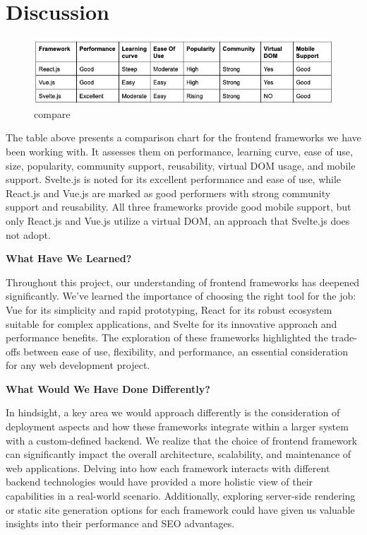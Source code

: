 \section{Discussion}

\begin{figure}[!htbp]
\centering
\includegraphics[width=\linewidth]{figs/compare.png}
\caption{compare}
\label{fig:compare}
\end{figure}

The table above presents a comparison chart for the frontend frameworks we have been working with. It assesses them on performance, learning curve, ease of use, size, popularity, community support, reusability, virtual DOM usage, and mobile support. Svelte.js is noted for its excellent performance and ease of use, while React.js and Vue.js are marked as good performers with strong community support and reusability. All three frameworks provide good mobile support, but only React.js and Vue.js utilize a virtual DOM, an approach that Svelte.js does not adopt.

\textbf{What Have We Learned?}

Throughout this project, our understanding of frontend frameworks has deepened significantly. We've learned the importance of choosing the right tool for the job: Vue for its simplicity and rapid prototyping, React for its robust ecosystem suitable for complex applications, and Svelte for its innovative approach and performance benefits. The exploration of these frameworks highlighted the trade-offs between ease of use, flexibility, and performance, an essential consideration for any web development project.

\textbf{What Would We Have Done Differently?}

In hindsight, a key area we would approach differently is the consideration of deployment aspects and how these frameworks integrate within a larger system with a custom-defined backend. We realize that the choice of frontend framework can significantly impact the overall architecture, scalability, and maintenance of web applications. Delving into how each framework interacts with different backend technologies would have provided a more holistic view of their capabilities in a real-world scenario. Additionally, exploring server-side rendering or static site generation options for each framework could have given us valuable insights into their performance and SEO advantages.

